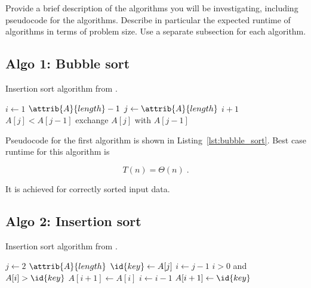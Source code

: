 
Provide a brief description of the algorithms you will be
investigating, including pseudocode for the algorithms. Describe in
particular the expected runtime of algorithms in terms of problem
size.  Use a separate subsection for each algorithm.

\subsection{Algo 1: Bubble sort}\label{sec:algo1}

\begin{algorithm}[H]
  \caption{Insertion sort algorithm from \cite[Ch.~2.1]{cormen_introduction_2009}.}
  \label{lst:bubble_sort}
  \begin{codebox}
    \li \For $i \gets 1$ \To $\attrib{A}{length} - 1$
    \li \Do \For $j \gets \attrib{A}{length}$ \Downto $i + 1$
    \li 	\Do \If $A[j] < A[j - 1]$
    \li         \Then exchange $A[j]$ with $A[j - 1]$
    \End    
    \End
    \End
  \end{codebox}
\end{algorithm}

Pseudocode for the first algorithm is shown in
Listing~\ref{lst:bubble_sort}. Best case runtime for this algorithm
is

\begin{equation}
  T(n) = \Theta(n) \;.  \label{eq:ins_sort_best}
\end{equation}

It is achieved for correctly sorted input data.

\subsection{Algo 2: Insertion sort}\label{sec:algo2}

\begin{algorithm}[H]
  \caption{Insertion sort algorithm from \cite[Ch.~2.1]{cormen_introduction_2009}.}
  \label{lst:insertion_algo}
  \begin{codebox}
    \li \For $j \gets 2$ \To $\attrib{A}{length}$
    \li \Do
    $\id{key} \gets A[j]$
    \li     $i \gets j-1$
    \li      \While $i>0$ and $A[i] > \id{key}$
    \li      \Do
    $A[i+1] \gets A[i]$
    \li         $i \gets i-1$
    \End    
    \li       $A[i+1]\gets \id{key}$
    \End
  \end{codebox}
\end{algorithm}

